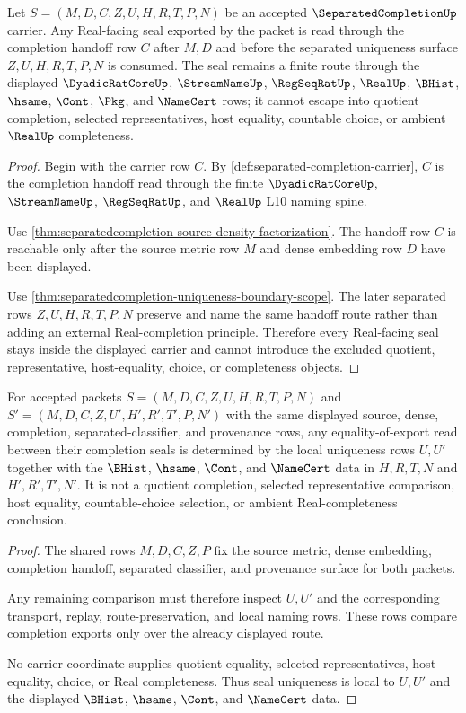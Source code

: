 \begin{theorem}\label{thm:separatedcompletion-realseal-nonescape}
Let $S=(M,D,C,Z,U,H,R,T,P,N)$ be an accepted $\SeparatedCompletionUp$ carrier. Any Real-facing seal exported by the packet is read through the completion handoff row $C$ after $M,D$ and before the separated uniqueness surface $Z,U,H,R,T,P,N$ is consumed. The seal remains a finite route through the displayed $\DyadicRatCoreUp$, $\StreamNameUp$, $\RegSeqRatUp$, $\RealUp$, $\BHist$, $\hsame$, $\Cont$, $\Pkg$, and $\NameCert$ rows; it cannot escape into quotient completion, selected representatives, host equality, countable choice, or ambient $\RealUp$ completeness.
\end{theorem}
\begin{proof}
Begin with the carrier row $C$. By \autoref{def:separated-completion-carrier}, $C$ is the completion handoff read through the finite $\DyadicRatCoreUp$, $\StreamNameUp$, $\RegSeqRatUp$, and $\RealUp$ L10 naming spine.

Use \autoref{thm:separatedcompletion-source-density-factorization}. The handoff row $C$ is reachable only after the source metric row $M$ and dense embedding row $D$ have been displayed.

Use \autoref{thm:separatedcompletion-uniqueness-boundary-scope}. The later separated rows $Z,U,H,R,T,P,N$ preserve and name the same handoff route rather than adding an external Real-completion principle. Therefore every Real-facing seal stays inside the displayed carrier and cannot introduce the excluded quotient, representative, host-equality, choice, or completeness objects.
\end{proof}

\begin{theorem}
\label{thm:separated-completion-seal-uniqueness}
For accepted packets $S=(M,D,C,Z,U,H,R,T,P,N)$ and $S'=(M,D,C,Z,U',H',R',T',P,N')$ with the same displayed source, dense, completion, separated-classifier, and provenance rows, any equality-of-export read between their completion seals is determined by the local uniqueness rows $U,U'$ together with the $\BHist$, $\hsame$, $\Cont$, and $\NameCert$ data in $H,R,T,N$ and $H',R',T',N'$. It is not a quotient completion, selected representative comparison, host equality, countable-choice selection, or ambient Real-completeness conclusion.
\end{theorem}
\begin{proof}
The shared rows $M,D,C,Z,P$ fix the source metric, dense embedding, completion handoff, separated classifier, and provenance surface for both packets.

Any remaining comparison must therefore inspect $U,U'$ and the corresponding transport, replay, route-preservation, and local naming rows. These rows compare completion exports only over the already displayed route.

No carrier coordinate supplies quotient equality, selected representatives, host equality, choice, or Real completeness. Thus seal uniqueness is local to $U,U'$ and the displayed $\BHist$, $\hsame$, $\Cont$, and $\NameCert$ data.
\end{proof}

